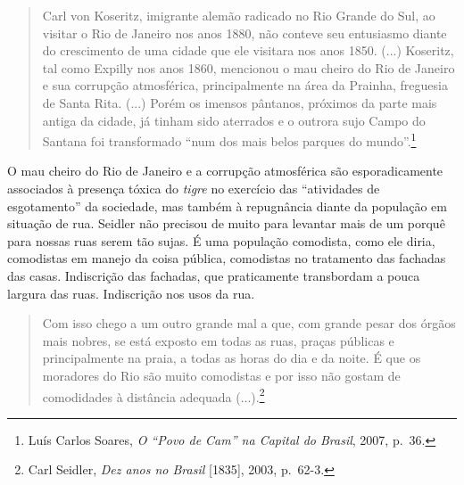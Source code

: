 \begin{quote}
Carl von Koseritz, imigrante alemão radicado no Rio Grande do Sul, ao
visitar o Rio de Janeiro nos anos 1880, não conteve seu entusiasmo
diante do crescimento de uma cidade que ele visitara nos anos 1850.
(...) Koseritz, tal como Expilly nos anos 1860, mencionou o mau cheiro
do Rio de Janeiro e sua corrupção atmosférica, principalmente na área da
Prainha, freguesia de Santa Rita. (...) Porém os imensos pântanos,
próximos da parte mais antiga da cidade, já tinham sido aterrados e o
outrora sujo Campo do Santana foi transformado ``num dos mais belos
parques do mundo''.\footnote{Luís Carlos Soares, \emph{O ``Povo de Cam''
  na Capital do Brasil}, 2007, p.~36.}
\end{quote}

O mau cheiro do Rio de Janeiro e a corrupção atmosférica são
esporadicamente associados à presença tóxica do \emph{tigre} no
exercício das ``atividades de esgotamento'' da sociedade, mas também à
repugnância diante da população em situação de rua. Seidler não precisou
de muito para levantar mais de um porquê para nossas ruas serem tão
sujas. É uma população comodista, como ele diria, comodistas em manejo
da coisa pública, comodistas no tratamento das fachadas das casas.
Indiscrição das fachadas, que praticamente transbordam a pouca largura
das ruas. Indiscrição nos usos da rua.

\begin{quote}
Com isso chego a um outro grande mal a que, com grande pesar dos órgãos
mais nobres, se está exposto em todas as ruas, praças públicas e
principalmente na praia, a todas as horas do dia e da noite. É que os
moradores do Rio são muito comodistas e por isso não gostam de
comodidades à distância adequada (...).\footnote{Carl Seidler, \emph{Dez
  anos no Brasil} {[}1835{]}, 2003, p.~62-3.}
\end{quote}

